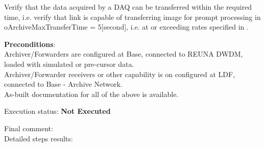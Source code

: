 \documentclass[DM,lsstdraft,STR,toc]{lsstdoc}
\begin{document}
Verify that the data acquired by a DAQ can be transferred within the
required time, i.e. verify that link is capable of transferring image
for prompt processing in oArchiveMaxTransferTime = 5{[}second{]}, i.e.
at or exceeding rates specified in .

\textbf{ Preconditions}:\\
Archiver/Forwarders are configured at Base, connected to REUNA DWDM,
loaded with simulated or pre-cursor data.\\
Archiver/Forwarder receivers or other capability is on configured at
LDF, connected to Base - Archive Network.\\
As-built documentation for all of the above is available.

Execution status: {\bf Not Executed }

Final comment:\\


Detailed steps results:
\end{document}
